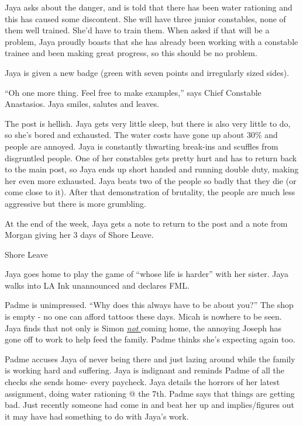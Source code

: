 Jaya asks about the danger, and is told that there has been water rationing and this has caused some discontent.  She will have three junior constables, none of them well trained.  She'd have to train them.  When asked if that will be a problem, Jaya proudly boasts that she has already been working with a constable trainee and been making great progress, so this should be no problem.



Jaya is given a new badge (green with seven points and irregularly sized sides).



``Oh one more thing.  Feel free to make examples,''  says Chief Constable Anastasios.  Jaya smiles, salutes and leaves.



The post is hellish.  Jaya gets very little sleep, but there is also very little to do, so she's bored and exhausted.  The water costs have gone up about 30\% and people are annoyed.  Jaya is constantly thwarting break-ins and scuffles from disgruntled people.  One of her constables gets pretty hurt and has to return back to the main post, so Jaya ends up short handed and running double duty, making her even more exhausted.  Jaya beats two of the people so badly that they die (or come close to it).  After that demonstration of brutality, the people are much less aggressive but there is more grumbling.



At the end of the week, Jaya gets a note to return to the post and a note from Morgan giving her 3 days of Shore Leave.



 {\LARGE Shore Leave } 



Jaya goes home to play the game of ``whose life is harder'' with her sister.  Jaya walks into LA Ink unannounced and declares FML.



Padme is unimpressed.  ``Why does this always have to be about you?''  The shop is empty - no one can afford tattoos these days.  Micah is nowhere to be seen.  Jaya finds that not only is Simon \underline{ \textit{not } }coming home, the annoying Joseph has gone off to work to help feed the family.  Padme thinks she's expecting again too.



Padme accuses Jaya of never being there and just lazing around while the family is working hard and suffering.  Jaya is indignant and reminds Padme of all the checks she sends home- every paycheck.  Jaya details the horrors of her latest assignment, doing water rationing @ the 7th. Padme says that things are getting bad.  Just recently someone had come in and beat her up and implies/figures out it may have had something to do with Jaya's work. 



